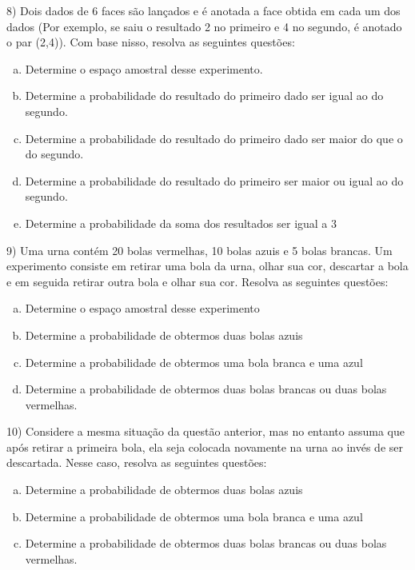 \documentclass{article}
\begin{document}
\vspace{5px}

8) Dois dados de 6 faces são lançados e é anotada a face obtida em cada um dos dados (Por exemplo, se saiu o resultado 2 no primeiro e 4 no segundo, é anotado o par (2,4)). Com base nisso, resolva as seguintes questões:
\begin{enumerate}[a)] %
    \item Determine o espaço amostral desse experimento.
    \item Determine a probabilidade do resultado do primeiro dado ser igual ao do segundo.
    \item Determine a probabilidade do resultado do primeiro dado ser maior do que o do segundo. 
    \item Determine a probabilidade do resultado do primeiro ser maior ou igual ao do segundo. 
    \item Determine a probabilidade da soma dos resultados ser igual a 3
\end{enumerate}


\vspace{5px}

9) Uma urna contém 20 bolas vermelhas, 10 bolas azuis e 5 bolas brancas. Um experimento consiste em retirar uma bola da urna, olhar sua cor, descartar a bola e em seguida retirar outra bola e olhar sua cor. Resolva as seguintes questões:

\begin{enumerate}[a)] %
    \item Determine o espaço amostral desse experimento
    \item Determine a probabilidade de obtermos duas bolas azuis
    \item Determine a probabilidade de obtermos uma bola branca e uma azul
    \item Determine a probabilidade de obtermos duas bolas brancas ou duas bolas vermelhas. 
\end{enumerate}

10) Considere a mesma situação da questão anterior, mas no entanto assuma que após retirar a primeira bola, ela seja colocada novamente na urna ao invés de ser descartada. Nesse caso, resolva as seguintes questões:

\begin{enumerate}[a)] %
    \item Determine a probabilidade de obtermos duas bolas azuis
    \item Determine a probabilidade de obtermos uma bola branca e uma azul
    \item Determine a probabilidade de obtermos duas bolas brancas ou duas bolas vermelhas. 
\end{enumerate}
\end{document}

